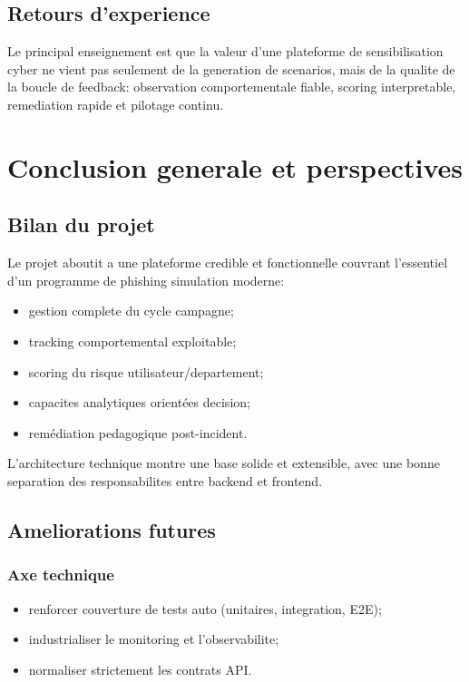 \documentclass[12pt,a4paper,oneside]{report}
\begin{document}
\section{Retours d'experience}
Le principal enseignement est que la valeur d'une plateforme de sensibilisation cyber ne vient pas seulement de la generation de scenarios, mais de la qualite de la boucle de feedback: observation comportementale fiable, scoring interpretable, remediation rapide et pilotage continu.

\chapter{Conclusion generale et perspectives}

\section{Bilan du projet}
Le projet aboutit a une plateforme credible et fonctionnelle couvrant l'essentiel d'un programme de phishing simulation moderne:
\begin{itemize}[leftmargin=1.2cm]
  \item gestion complete du cycle campagne;
  \item tracking comportemental exploitable;
  \item scoring du risque utilisateur/departement;
  \item capacites analytiques orientées decision;
  \item remédiation pedagogique post-incident.
\end{itemize}

L'architecture technique montre une base solide et extensible, avec une bonne separation des responsabilites entre backend et frontend.

\section{Ameliorations futures}
\subsection{Axe technique}
\begin{itemize}[leftmargin=1.2cm]
  \item renforcer couverture de tests auto (unitaires, integration, E2E);
  \item industrialiser le monitoring et l'observabilite;
  \item normaliser strictement les contrats API.
\end{itemize}
\end{document}
